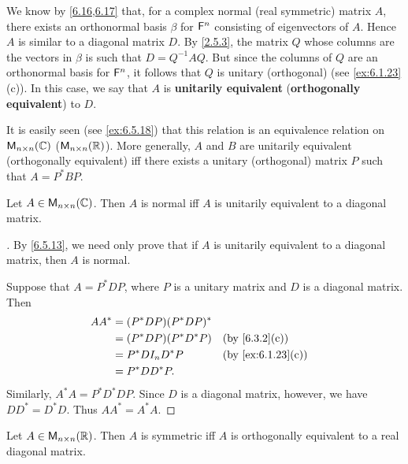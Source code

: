 \begin{defn}\label{6.5.13}
	We know by \cref{6.16,6.17} that, for a complex normal (real symmetric) matrix \(A\), there exists an orthonormal basis \(\beta\) for \(\mathsf{F}^n\) consisting of eigenvectors of \(A\).
	Hence \(A\) is similar to a diagonal matrix \(D\).
	By \cref{2.5.3}, the matrix \(Q\) whose columns are the vectors in \(\beta\) is such that \(D = Q^{-1} A Q\).
	But since the columns of \(Q\) are an orthonormal basis for \(\mathsf{F}^n\), it follows that \(Q\) is unitary (orthogonal) (see \cref{ex:6.1.23}(c)).
	In this case, we say that \(A\) is \textbf{unitarily equivalent} (\textbf{orthogonally equivalent}) to \(D\).

	It is easily seen (see \cref{ex:6.5.18}) that this relation is an equivalence relation on \(\ms[n][n][\C]\) (\(\ms[n][n][\R]\)).
	More generally, \(A\) and \(B\) are unitarily equivalent (orthogonally equivalent) iff there exists a unitary (orthogonal) matrix \(P\) such that \(A = P^* B P\).
\end{defn}

\begin{thm}\label{6.19}
	Let \(A \in \ms[n][n][\C]\).
	Then \(A\) is normal iff \(A\) is unitarily equivalent to a diagonal matrix.
\end{thm}

\begin{proof}[]
	By \cref{6.5.13}, we need only prove that if \(A\) is unitarily equivalent to a diagonal matrix, then \(A\) is normal.

	Suppose that \(A = P^* D P\), where \(P\) is a unitary matrix and \(D\) is a diagonal matrix.
	Then
	\begin{align*}
		A A^* & = (P^* D P) (P^* D P)^*                        \\
		      & = (P^* D P) (P^* D^* P) &  & \by{6.3.2}[c]     \\
		      & = P^* D I_n D^* P       &  & \by{ex:6.1.23}[c] \\
		      & = P^* D D^* P.
	\end{align*}
	Similarly, \(A^* A = P^* D^* D P\).
	Since \(D\) is a diagonal matrix, however, we have \(D D^* = D^* D\).
	Thus \(A A^* = A^* A\).
\end{proof}

\begin{thm}\label{6.20}
	Let \(A \in \ms[n][n][\R]\).
	Then \(A\) is symmetric iff \(A\) is orthogonally equivalent to a real diagonal matrix.
\end{thm}

